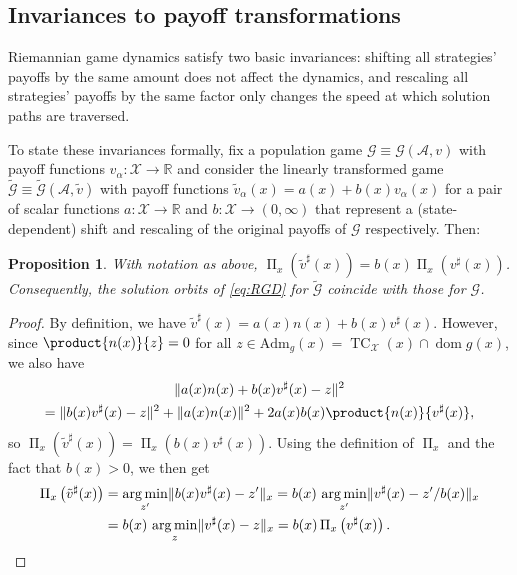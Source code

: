 \documentclass[reqno]{amsart}
\DeclarePairedDelimiter{\norm}{\lVert}{\rVert}
\theoremstyle{plain}
\newtheorem{proposition}[theorem]{Proposition}
\theoremstyle{definition}
\theoremstyle{remark}
\numberwithin{equation}{section}
\numberwithin{theorem}{section}
\begin{document}
\subsection{Invariances to payoff transformations}
\label{sec:shifts}

Riemannian game dynamics satisfy two basic invariances:
shifting all strategies' payoffs by the same amount does not affect the dynamics,
and rescaling all strategies' payoffs by the same factor only changes the speed at which solution paths are traversed. 

To state these invariances formally, fix a population game ${\mathcal{G}}\equiv{{\mathcal{G}}({\mathcal{A}},{v})}$ with payoff functions ${v}_{\alpha}{\colon}{\mathcal{X}}\to{\mathbb{R}}$ and consider the linearly transformed game $\tilde{\mathcal{G}} \equiv \tilde{\mathcal{G}}({\mathcal{A}},\tilde{v})$ with payoff functions $\tilde{v}_{\alpha}(x) = a(x) + b(x) {v}_{\alpha}(x)$ for a pair of scalar functions $a{\colon}{\mathcal{X}}\to{\mathbb{R}}$ and $b{\colon}{\mathcal{X}}\to(0,\infty)$ that represent a (state-dependent) shift and rescaling of the original payoffs of ${\mathcal{G}}$ respectively.
Then:

\begin{proposition}
\label{prop:shifts}
With notation as above, $\operatorname{\Pi}_{x}(\tilde{v}^{\sharp}(x)) = b(x) \operatorname{\Pi}_{x}({v}^{\sharp}(x))$.
Consequently, the solution orbits of \eqref{eq:RGD} for $\tilde{\mathcal{G}}$ coincide with those for ${\mathcal{G}}$.
\end{proposition}

\begin{proof}
By definition, we have $\tilde{v}^{\sharp}(x) = a(x) {n}(x) + b(x) {v}^{\sharp}(x)$.
However, since $\product{{n}(x)}{z} = 0$ for all $z\in{\textrm{Adm}_{g}}(x) = \operatorname{TC}_{\mathcal{X}}(x) \cap {\operatorname{dom} g}(x)$, we also have
\begin{multline}
\norm{a(x){n}(x) + b(x) {v}^{\sharp}(x) - z}^{2}
	\\
	= \norm{b(x){v}^{\sharp}(x) - z}^{2}
	+ \norm{a(x) {n}(x)}^{2}
	+ 2 a(x) b(x) \product{{n}(x)}{{v}^{\sharp}(x)},
\end{multline}
so $\operatorname{\Pi}_{x}( \tilde{v}^{\sharp}(x) ) = \operatorname{\Pi}_{x} (b(x) {v}^{\sharp}(x))$.
Using the definition of $\operatorname{\Pi}_{x}$ and the fact that $b(x)>0$,
we then get
\begin{align*}
\operatorname{\Pi}_{x}\left( \tilde{v}^{\sharp}(x) \right)
	&{\textstyle}
	=\operatorname*{arg\,min}_{z'} \norm{b(x) {v}^{\sharp}(x) - z'}_{x}
	= b(x) \, \operatorname*{arg\,min}_{z'} \norm{{v}^{\sharp}(x) - z'/b(x)}_{x}
	\notag\\
	&{\textstyle}
	= b(x) \, \operatorname*{arg\,min}_{z} \norm{{v}^{\sharp}(x) - z}_{x}
	=b(x) \operatorname{\Pi}_{x}\left( {v}^{\sharp}(x) \right).
	\qedhere
\end{align*}
\end{proof}
\end{document}
